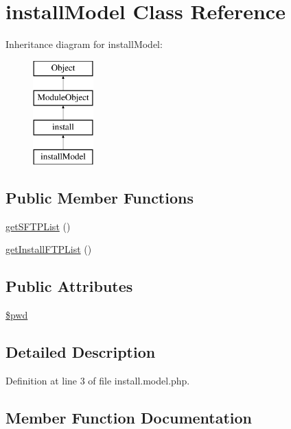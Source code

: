 \hypertarget{classinstallModel}{}\section{install\+Model Class Reference}
\label{classinstallModel}
Inheritance diagram for install\+Model\+:\begin{figure}[H]
\begin{center}
\leavevmode
\includegraphics[height=4.000000cm]{classinstallModel}
\end{center}
\end{figure}
\subsection*{Public Member Functions}
\begin{DoxyCompactItemize}
\item 
\hyperlink{classinstallModel_acf556177e975e834524be848f14d5348}{get\+S\+F\+T\+P\+List} ()
\item 
\hyperlink{classinstallModel_a684579a29ff70929baa4ac64012f0bdf}{get\+Install\+F\+T\+P\+List} ()
\end{DoxyCompactItemize}
\subsection*{Public Attributes}
\begin{DoxyCompactItemize}
\item 
\hyperlink{classinstallModel_ae8a1df73f1708ec17897f21a40ab6c15}{\$pwd}
\end{DoxyCompactItemize}


\subsection{Detailed Description}


Definition at line 3 of file install.\+model.\+php.



\subsection{Member Function Documentation}
\hypertarget{classinstallModel_a684579a29ff70929baa4ac64012f0bdf}{}\label{classinstallModel_a684579a29ff70929baa4ac64012f0bdf} 
